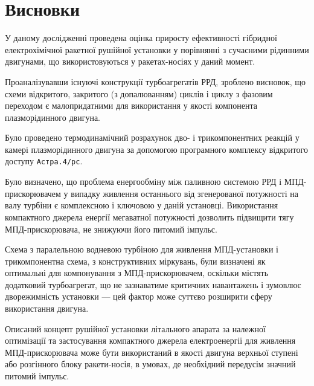 \chapter*{Висновки}


У даному дослідженні проведена оцінка приросту ефективності гібридної електрохімічної ракетної рушійної установки у порівнянні з сучасними рідинними двигунами, що використовуються у ракетах-носіях у даний момент.

Проаналізувавши існуючі конструкції турбоагрегатів РРД, зроблено висновок, що схеми відкритого, закритого (з допалюванням) циклів і циклу з фазовим переходом є малопридатними для використання у якості компонента плазморідинного двигуна.

Було проведено термодинамічний розрахунок дво- і трикомпонентних реакцій у камері плазморідинного двигуна за допомогою програмного комплексу відкритого доступу \texttt{Астра.4/рс}.

Було визначено, що проблема енергообміну між паливною системою РРД і МПД-прискорювачем у випадку живлення останнього від згенерованої потужності на валу турбіни є комплексною і ключовою у даній установці. Використання компактного джерела енергії мегаватної потужності дозволить підвищити тягу МПД-прискорювача, не знижуючи його питомий імпульс.

Схема з паралельною водневою турбіною для живлення МПД-установки і трикомпонентна схема, з конструктивних міркувань, були визначені як оптимальні для компонування з МПД-прискорювачем, оскільки містять додатковий турбоагрегат, що не зазнаватиме критичних навантажень і зумовлює дворежимність установки --- цей фактор може суттєво розширити сферу використання двигуна.

Описаний концепт рушійної установки літального апарата за належної оптимізації та застосування компактного джерела електроенергії для живлення МПД-прискорювача може бути використаний в якості двигуна верхньої ступені або розгінного блоку ракети-носія, в умовах, де необхідний передусім значний питомий імпульс. 
